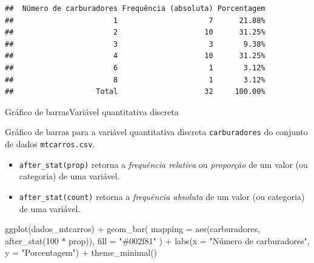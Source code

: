 \documentclass[
  10pt,
  ignorenonframetext,
]{beamer}
\newenvironment{Shaded}{}{}
\newcommand{\DataTypeTok}[1]{#1}
\newcommand{\DecValTok}[1]{#1}
\newcommand{\KeywordTok}[1]{\textcolor[rgb]{0.00,0.00,1.00}{#1}}
\newcommand{\NormalTok}[1]{#1}
\newcommand{\OperatorTok}[1]{#1}
\newcommand{\StringTok}[1]{\textcolor[rgb]{0.00,0.50,0.50}{#1}}
\providecommand{\tightlist}{%
  \setlength{\itemsep}{0pt}\setlength{\parskip}{0pt}}
\begin{document}
\begin{frame}[fragile]
\small

\begin{verbatim}
##  Número de carburadores Frequência (absoluta) Porcentagem
##                       1                     7      21.88%
##                       2                    10      31.25%
##                       3                     3       9.38%
##                       4                    10      31.25%
##                       6                     1       3.12%
##                       8                     1       3.12%
##                   Total                    32     100.00%
\end{verbatim}

\normalsize
\end{frame}

\begin{frame}[fragile]{Gráfico de barras\newline Variável quantitativa
discreta}
\protect\hypertarget{gruxe1fico-de-barrasvariuxe1vel-quantitativa-discreta}{}
\small

Gráfico de barras para a variável quantitativa discreta
\texttt{carburadores} do conjunto de dados \texttt{mtcarros.csv}.

\begin{itemize}
\tightlist
\item
  \texttt{after\_stat(prop)} retorna a \emph{frequência relativa} ou
  \emph{proporção} de um valor (ou categoria) de uma variável.
\item
  \texttt{after\_stat(count)} retorna a \emph{frequência absoluta} de um
  valor (ou categoria) de uma variável.
\end{itemize}

\begin{Shaded}
\begin{Highlighting}[]
\KeywordTok{ggplot}\NormalTok{(dados\_mtcarros) }\OperatorTok{+}
\StringTok{  }\KeywordTok{geom\_bar}\NormalTok{(}
    \DataTypeTok{mapping =} \KeywordTok{aes}\NormalTok{(carburadores, }\KeywordTok{after\_stat}\NormalTok{(}\DecValTok{100} \OperatorTok{*}\StringTok{ }\NormalTok{prop)),}
    \DataTypeTok{fill =} \StringTok{"\#002f81"}
\NormalTok{  ) }\OperatorTok{+}
\StringTok{  }\KeywordTok{labs}\NormalTok{(}\DataTypeTok{x =} \StringTok{"Número de carburadores"}\NormalTok{, }\DataTypeTok{y =} \StringTok{"Porcentagem"}\NormalTok{) }\OperatorTok{+}
\StringTok{  }\KeywordTok{theme\_minimal}\NormalTok{()}
\end{Highlighting}
\end{Shaded}

\normalsize
\end{frame}
\end{document}
